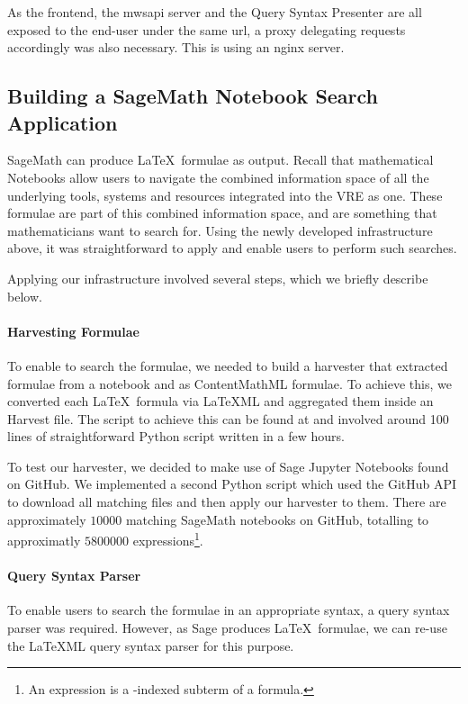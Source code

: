 As the frontend, the mwsapi server and the Query Syntax Presenter are all exposed to the end-user under the same url, a proxy delegating requests accordingly was also necessary. 
This is using an nginx server. 

\subsection{Building a SageMath Notebook Search Application}

SageMath can produce \LaTeX\ formulae as output. 
Recall that mathematical Notebooks allow users to navigate the combined information space of all the underlying tools, systems and resources integrated into the VRE as one. 
These formulae are part of this combined information space, and are something that mathematicians want to search for.
Using the newly developed infrastructure above, it was straightforward to apply \MWS and enable users to perform such searches. 

Applying our infrastructure involved several steps, which we briefly describe below.

\paragraph{Harvesting Formulae}
To enable \MWS to search the formulae, we needed to build a harvester that extracted formulae from a notebook and as ContentMathML formulae. 
To achieve this, we converted each \LaTeX\ formula via LaTeXML and aggregated them inside an \MWS Harvest file. 
The script to achieve this can be found at \cite{mwsjupyterharvest:github:on} and involved around 100 lines of straightforward Python script written in a few hours. 

To test our harvester, we decided to make use of Sage Jupyter Notebooks found on GitHub. 
We implemented a second Python script which used the GitHub API to download all matching files and then apply our harvester to them. 
There are approximately $10000$ matching SageMath notebooks on GitHub, totalling to approximatly $5800000$ expressions\footnote{An expression is a \MWS-indexed subterm of a formula. }. 
\paragraph{Query Syntax Parser}

To enable users to search the formulae in an appropriate syntax, a query syntax parser was required. 
However, as Sage produces \LaTeX\ formulae, we can re-use the {\LaTeX}ML query syntax parser for this purpose. 

